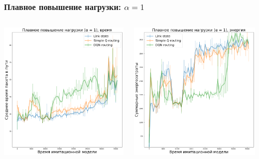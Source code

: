 \documentclass{beamer}
\begin{document}

\begin{frame}
  \frametitle{Плавное повышение нагрузки: $\alpha = 1$}
  \begin{columns}
    \begin{column}{0.5\textwidth}
      \includegraphics[width=\textwidth]{experiment-conveyors-a1-time-tall}
    \end{column}
    \begin{column}{0.5\textwidth}
      \includegraphics[width=\textwidth]{experiment-conveyors-a1-energy-tall}
    \end{column}
  \end{columns}
\end{frame}
\end{document}
